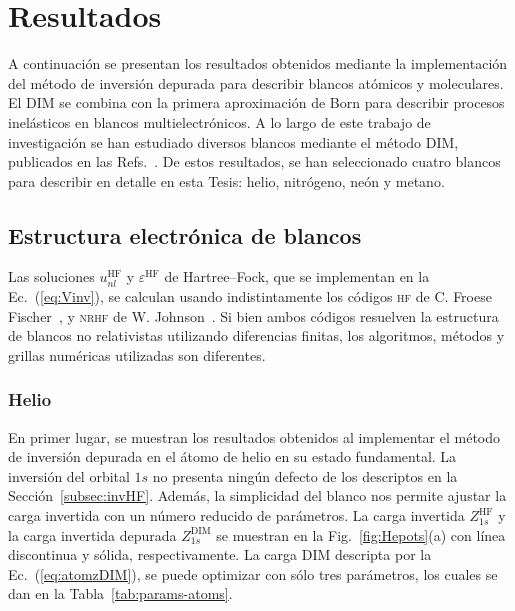 \section{Resultados}
\label{sec:dimresultados}

A continuación se presentan los resultados obtenidos mediante la 
implementación del método de inversión depurada para describir blancos
atómicos y moleculares. El DIM se combina con la primera aproximación de 
Born para describir procesos inelásticos en blancos multielectrónicos. 
A lo largo de este trabajo de investigación se han estudiado diversos 
blancos mediante el método DIM, publicados en las Refs.~\cite{Mendez:16,
Mendez:19dim,Mendez:18}. De estos resultados, se han seleccionado cuatro 
blancos para describir en detalle en esta Tesis: helio, nitrógeno, neón 
y metano.

\subsection{Estructura electrónica de blancos}
\label{subsec:dimtarget}

Las soluciones $u_{nl}^{\mathrm{HF}}$ y $\varepsilon^{\mathrm{HF}}$ de 
Hartree--Fock, que se implementan en la Ec.~(\ref{eq:Vinv}), se calculan 
usando indistintamente los códigos \textsc{hf} de C. Froese 
Fischer~\cite{FroeseFischer:97}, y \textsc{nrhf} de W. 
Johnson~\cite{Johnson:07}. Si bien ambos códigos resuelven la estructura
de blancos no relativistas utilizando diferencias finitas, los 
algoritmos, métodos y grillas numéricas utilizadas son diferentes. 

\subsubsection{Helio}

En primer lugar, se muestran los resultados obtenidos al implementar
el método de inversión depurada en el átomo de helio en su estado
fundamental. La inversión del orbital $1s$ no presenta ningún defecto
de los descriptos en la Sección~\ref{subsec:invHF}. Además, la 
simplicidad del blanco nos permite ajustar la carga invertida con un 
número reducido de parámetros. La carga invertida $Z_{1s}^{\mathrm{HF}}$ 
y la carga invertida depurada $Z_{1s}^{\mathrm{DIM}}$ se muestran en la 
Fig.~\ref{fig:Hepots}(a) con línea discontinua y sólida, 
respectivamente. La carga DIM descripta por la Ec.~(\ref{eq:atomzDIM}), 
se puede optimizar con sólo tres parámetros, los cuales se dan en la 
Tabla~\ref{tab:params-atoms}. 

